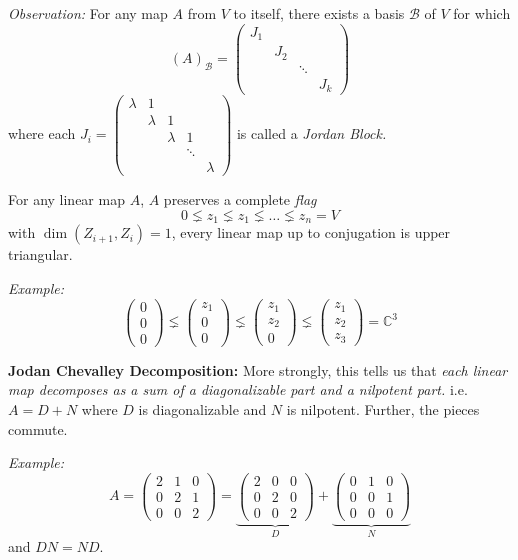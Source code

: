 \documentclass[12pt]{article}
\newcommand{\C}{\mathbb{C}}
\begin{document}
    \emph{Observation:} For any map $A$ from $V$ to itself, there exists a basis $\mathcal{B}$ of $V$ for which 
    \[(A)_{\mathcal{B}} = \begin{pmatrix}
        J_1\\ 
        & J_2\\ 
        & & \ddots\\ 
        & & & J_k
    \end{pmatrix}\] 
    where each $J_i = \begin{pmatrix}
        \lambda & 1\\ 
        & \lambda & 1\\ 
        & & \lambda & 1\\ 
        & & & \ddots\\ 
        & & & & \lambda
    \end{pmatrix}$ is called a \emph{Jordan Block.} 

    For any linear map $A$, $A$ preserves a complete \emph{flag} 
    \[0 \lneq z_1 \lneq z_1 \lneq \dots \lneq z_n = V\] 
    with $\dim(Z_{i+1}, Z_i) = 1$, every linear map up to conjugation is upper triangular. 

    \emph{Example:} 
    \[\begin{pmatrix}
        0\\0\\0
    \end{pmatrix} \lneq \begin{pmatrix}
        z_1\\ 0\\0
    \end{pmatrix} \lneq \begin{pmatrix}
        z_1\\ z_2\\0
    \end{pmatrix}\lneq  \begin{pmatrix}
        z_1\\ z_2\\z_3
    \end{pmatrix} = \C^3\] 

    \textbf{Jodan Chevalley Decomposition:}
    More strongly, this tells us that \emph{each linear map decomposes as a sum of a diagonalizable part and a nilpotent part.} i.e. $A = D + N$ where $D$ is diagonalizable and $N$ is nilpotent. Further, the pieces commute. 

    \emph{Example:} 
    \[A = \begin{pmatrix}
        2 & 1 & 0\\ 
        0 & 2 & 1\\ 
        0 & 0 & 2
    \end{pmatrix} = \underbrace{\begin{pmatrix}
        2 & 0 & 0\\ 
        0 & 2& 0\\ 
        0 & 0 & 2
    \end{pmatrix}}_{D} + \underbrace{\begin{pmatrix}
        0 & 1 & 0\\ 
        0 & 0 & 1\\ 
        0 & 0 & 0
    \end{pmatrix}}_{N}\] 
    and $DN = ND$. 
\end{document}
